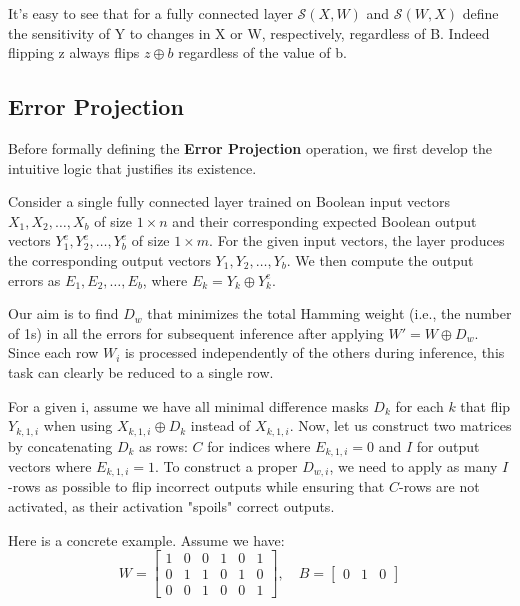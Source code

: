 \documentclass{article}
\theoremstyle{definition}
\theoremstyle{remark}
\begin{document}
It's easy to see that for a fully connected layer \( \mathcal{S}(X, W) \) and \( \mathcal{S}(W, X) \) define the sensitivity of Y to changes in X or W, respectively, regardless of B. Indeed flipping z always flips \( z \oplus b \) regardless of the value of b.

\subsection{Error Projection}
Before formally defining the \textbf{Error Projection} operation, we first develop the intuitive logic that justifies its existence.

Consider a single fully connected layer trained on Boolean input vectors \( X_1, X_2, \dots, X_b \) of size \( 1 \times n \) and their corresponding expected Boolean output vectors \( Y^e_1, Y^e_2, \dots, Y^e_b \) of size \( 1 \times m \). For the given input vectors, the layer produces the corresponding output vectors \( Y_1, Y_2, \dots, Y_b \). We then compute the output errors as \( E_1, E_2, \dots, E_b \), where \( E_k = Y_k \oplus Y^e_k \).

Our aim is to find \( D_w \) that minimizes the total Hamming weight (i.e., the number of 1s) in all the errors for subsequent inference after applying \( W' = W \oplus D_w \). Since each row \( W_i \) is processed independently of the others during inference, this task can clearly be reduced to a single row.

For a given i, assume we have all minimal difference masks \( D_k \) for each \( k \) that flip \( Y_{k,1,i} \) when using \( X_{k,1,i} \oplus D_k \) instead of \( X_{k,1,i} \). Now, let us construct two matrices by concatenating \( D_k \) as rows: \( C \) for indices where \( E_{k,1,i} = 0 \) and \( I \) for output vectors where \( E_{k,1,i} = 1 \). To construct a proper \( D_{w,i} \), we need to apply as many \( I \)-rows as possible to flip incorrect outputs while ensuring that \( C \)-rows are not activated, as their activation "spoils" correct outputs.

Here is a concrete example. Assume we have:
\[
    W = \begin{bmatrix}
        1 & 0 & 0 & 1 & 0 & 1 \\
        0 & 1 & 1 & 0 & 1 & 0 \\
        0 & 0 & 1 & 0 & 0 & 1
    \end{bmatrix},
    \quad
    B = \begin{bmatrix}0 & 1 & 0 \end{bmatrix}
\]
\end{document}

